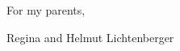 \cleardoublepage
\thispagestyle{empty}
\vspace*{0.5\textheight}
\begin{center}
For my parents,

Regina and Helmut Lichtenberger
\end{center}
\newpage

